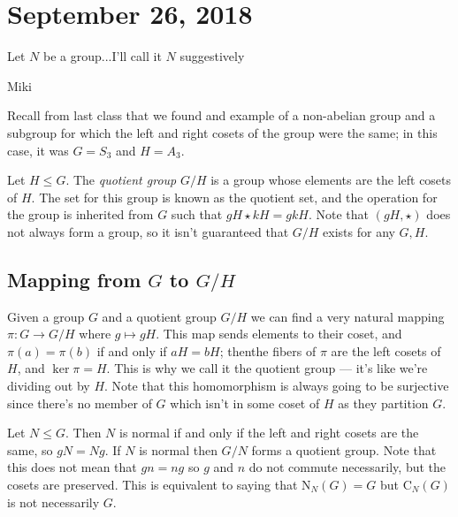\section{September 26, 2018}

\epigraph{Let $N$ be a group...I'll call it $N$ suggestively}{Miki}

Recall from last class that we found and example of a non-abelian group and a subgroup for which the left and right cosets of the group were the same; in this case, it was $G = S_3$ and $H = A_3$.

\begin{definition}
Let $H \leq G$. The \emph{quotient group} $G/H$ is a group whose elements are the left cosets of $H$. The set for this group is known as the quotient set, and the operation for the group is inherited from $G$ such that $gH \star kH = gk H$. Note that $(gH, \star)$ does not always form a group, so it isn't guaranteed that $G/H$ exists for any $G,H$. 
\end{definition}

\subsection{Mapping from \texorpdfstring{$G$}{G} to \texorpdfstring{$G/H$}{G/H}}

Given a group $G$ and a quotient group $G/H$ we can find a very natural mapping $\pi : G \to G/H$ where $g \mapsto gH$. This map sends elements to their coset, and $\pi(a) = \pi(b)$ if and only if $aH = bH$; thenthe fibers of $\pi$ are the left cosets of $H$, and $\ker \pi = H$. This is why we call it the quotient group --- it's like we're dividing out by $H$. Note that this homomorphism is always going to be surjective since there's no member of $G$ which isn't in some coset of $H$ as they partition $G$.

\begin{definition}
Let $N \leq G$. Then $N$ is normal if and only if the left and right cosets are the same, so $gN = Ng$. If $N$ is normal then $G/N$ forms a quotient group. Note that this does not mean that $gn = ng$ so $g$ and $n$ do not commute necessarily, but the cosets are preserved. This is equivalent to saying that $\mathrm{N}_N(G) = G$ but $\mathrm{C}_N(G)$ is not necessarily $G$.
\end{definition}

